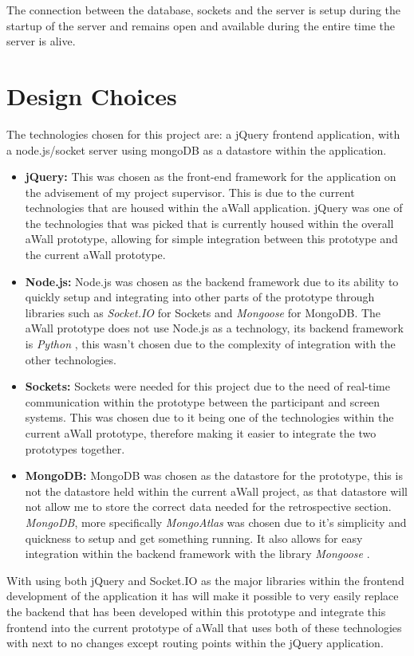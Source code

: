\documentclass[11pt
              , a4paper
              , twoside
              , openright
              ]{report}
\begin{document}
The connection between the database, sockets and the server is setup during the startup of the server and remains open and available during the entire time the server is alive.

\section{Design Choices}
The technologies chosen for this project are: a jQuery frontend application, with a node.js/socket server using mongoDB as a datastore within the application. 
\begin{itemize}
	\item \textbf{jQuery:} \cite{js.foundation_2018}  This was chosen as the front-end framework for the application on the advisement of my project supervisor. This is due to the current technologies that are housed within the aWall application. jQuery was one of the technologies that was picked that is currently housed within the overall aWall prototype, allowing for simple integration between this prototype and the current aWall prototype. 
	\item \textbf{Node.js:} \cite{foundation_2018} Node.js was chosen as the backend framework due to its ability to quickly setup and integrating into other parts of the prototype through libraries such as \textit{Socket.IO} \cite{socket.io_2018} for Sockets and \textit{Mongoose} \cite{mongoose-odm-v5.1.3_2018} for MongoDB. The aWall prototype does not use Node.js as a technology, its backend framework is \textit{Python} \cite{welcome-to-python.org_2018}, this wasn't chosen due to the complexity of integration with the other technologies. 
	\item \textbf{Sockets:} \cite{socket.io_2018} Sockets were needed for this project due to the need of real-time communication within the prototype between the participant and screen systems. This was chosen due to it being one of the technologies within the current aWall prototype, therefore making it easier to integrate the two prototypes together.
	\item \textbf{MongoDB:} \cite{mongodb-for-giant-ideas_2018} MongoDB was chosen as the datastore for the prototype, this is not the datastore held within the current aWall project, as that datastore will not allow me to store the correct data needed for the retrospective section. \textit{MongoDB}, more specifically \textit{MongoAtlas} \cite{fully-managed-mongodb-hosted-on-aws-azure-and-gcp_2018} was chosen due to it's simplicity and quickness to setup and get something running. It also allows for easy integration within the backend framework with the library \textit{Mongoose} \cite{mongoose-odm-v5.1.3_2018}.
\end{itemize}
With using both jQuery and Socket.IO as the major libraries within the frontend development of the application it has will make it possible to very easily replace the backend that has been developed within this prototype and integrate this frontend into the current prototype of aWall that uses both of these technologies with next to no changes except routing points within the jQuery application.
\end{document}
